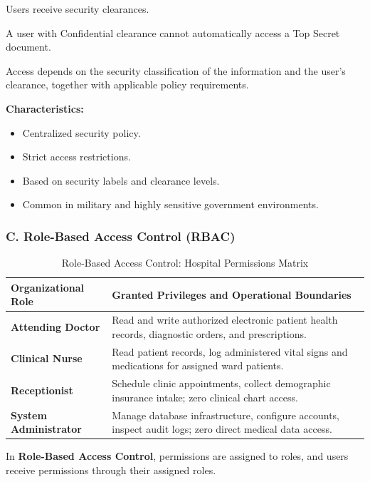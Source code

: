 Users receive security clearances.

A user with Confidential clearance cannot automatically access a Top Secret document.

Access depends on the security classification of the information and the user's clearance, together with applicable policy requirements.

\textbf{Characteristics:}

\begin{itemize}
\item Centralized security policy.
\item Strict access restrictions.
\item Based on security labels and clearance levels.
\item Common in military and highly sensitive government environments.
\end{itemize}

\subsubsection{C. Role-Based Access Control (RBAC)}

\begin{table}[htbp]
\centering
\caption{Role-Based Access Control: Hospital Permissions Matrix}
\label{tab:rbac_hospital}
\begin{tabularx}{\textwidth}{p{3.5cm} X}
\toprule
\textbf{Organizational Role} & \textbf{Granted Privileges and Operational Boundaries} \\
\midrule
\textbf{Attending Doctor} & Read and write authorized electronic patient health records, diagnostic orders, and prescriptions. \\
\textbf{Clinical Nurse} & Read patient records, log administered vital signs and medications for assigned ward patients. \\
\textbf{Receptionist} & Schedule clinic appointments, collect demographic insurance intake; zero clinical chart access. \\
\textbf{System Administrator} & Manage database infrastructure, configure accounts, inspect audit logs; zero direct medical data access. \\
\bottomrule
\end{tabularx}
\end{table}

In \textbf{Role-Based Access Control}, permissions are assigned to roles, and users receive permissions through their assigned roles.

